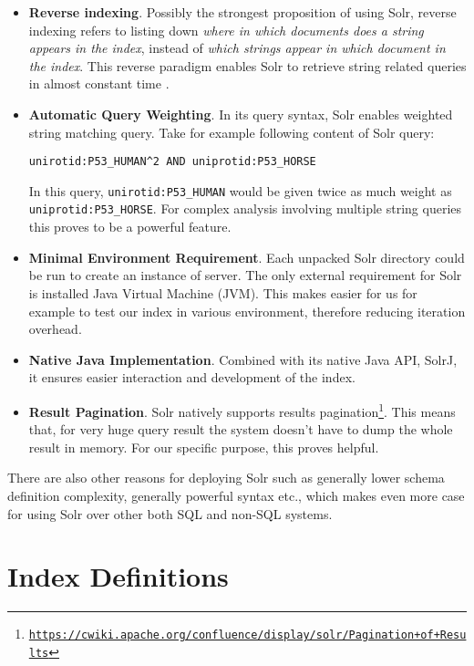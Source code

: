 \begin{itemize}
\item \textbf{Reverse indexing}. Possibly the strongest proposition of using Solr, reverse indexing refers to listing down \textit{where in which documents does a string appears in the index}, instead of \textit{which strings appear in which document in the index}. This reverse paradigm enables Solr to retrieve string related queries in almost constant time \citep{grainger2014solr}.
\item \textbf{Automatic Query Weighting}. In its query syntax, Solr enables weighted string matching query. Take for example following content of Solr query: 
\begin{center}
\texttt{unirotid:P53\_HUMAN\textasciicircum2 AND uniprotid:P53\_HORSE}
\end{center}
In this query, \texttt{unirotid:P53\_HUMAN} would be given twice as much weight as \texttt{uniprotid:P53\_HORSE}. For complex analysis involving multiple string queries this proves to be a powerful feature.
\item \textbf{Minimal Environment Requirement}. Each unpacked Solr directory could be run to create an instance of server. The only external requirement for Solr is installed Java Virtual Machine (JVM). This makes easier for us for example to test our index in various environment, therefore reducing iteration overhead.
\item \textbf{Native Java Implementation}. Combined with its native Java API, SolrJ, it ensures easier interaction and development of the index.
\item \textbf{Result Pagination}. Solr natively supports results pagination\footnote{\href{https://cwiki.apache.org/confluence/display/solr/Pagination+of+Results}{\texttt{https://cwiki.apache.org/confluence/display/solr/Pagination+of+Results}}}. This means that, for very huge query result the system doesn't have to dump the whole result in memory. For our specific purpose, this proves helpful.
\end{itemize}



There are also other reasons for deploying Solr such as generally lower schema definition complexity, generally powerful syntax etc., which makes even more case for using Solr over other both SQL and non-SQL systems.


\section{Index Definitions}



